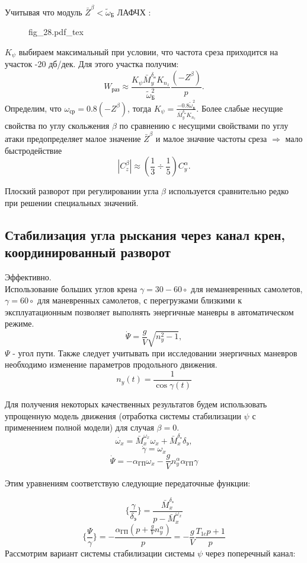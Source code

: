 \documentclass{article}
\begin{document}
Учитывая что модуль $\bar{Z}^\beta < \tilde{\omega}_\text{Б}$
ЛАФЧХ :
\begin{figure}[H]
	\centering
	{fig_28.pdf_tex}
\end{figure}

$K_{\psi}$ выбираем максимальный при условии, что частота среза приходится на участок -20 дб/дек. Для этого участка получим:
\[
	W_\text{раз} \approx \frac{K_{\psi}\bar{M}_y^{\delta_\text{н}} K_{n_z}}{\tilde{\omega}_\text{Б}^2}\frac{(-Z^\beta)}{p}.
\]
Определим, что $\omega_\text{ср} = 0.8(-Z^\beta)$, тогда $K_{\psi}=\frac{-0.8 \tilde{\omega}_\text{Б}^2}{\bar{M}_y^{\delta_\text{н}} K_{n_z}}$.
Более слабые несущие свойства по углу скольжения $\beta$ по сравнению с несущими свойствами по углу атаки предопределяет малое значение $\bar{Z}^\beta$ и малое значние частоты среза $\Rightarrow$ мало быстродействие
\[
	|C_z^\beta| \approx (\frac{1}{3} \div\frac{1}{5}) C_y^\alpha.
\]

Плоский разворот при регулировании угла $\beta$ используется сравнительно редко при решении специальных значений.

\subsection{Стабилизация угла рыскания через канал крен, координированный разворот}
Эффективно.\\
Использование больших углов крена $\gamma = 30 - 60 \circ$ для неманевренных самолетов, $\gamma = 60 \circ$ для маневренных самолетов, с перегрузками близкими к эксплуатационным позволяет выполнять энергичные маневры в автоматическом режиме.
\[
	\dot{\Psi} =\frac{g}{V} \sqrt{n_y^2 -1},
\]
$\Psi$ - угол пути. Также следует учитывать при исследовании энергичных маневров необходимо изменение параметров продольного движения.
\[
	n_y(t) =\frac{1}{\cos{\gamma(t)}}
\]

Для получения некоторых качественных результатов будем использовать упрощенную модель движения (отработка системы стабилизации $\psi$ с применением полной модели) для случая $\beta = 0$.
\[
	\dot{\omega_x} =\bar{M}_x^{\omega_x} \omega_x +\bar{M}_{x}^{\delta_\text{э}} \delta_\text{э},
\]
\[
	\dot{\gamma} = \omega_x
\]
\[
	\dot{\Psi} = - \alpha_\text{ГП}\omega_x - \frac{g}{V} n_y^\alpha \alpha_\text{ГП}\gamma
\]

Этим уравнениям соответствую следующие передаточные функции:

\[
	\{\frac{\gamma}{\delta_\text{э}} \} =\frac{\bar{M}_{x}^{\delta_\text{э}}}{p -\bar{M}_x^{\omega_x}}
\]
\[
	\{\frac{\Psi}{\gamma}\} = - \frac{\alpha_\text{ГП} (p + \frac{g}{V}n_y^\alpha)}{p} = -\frac{g}{V} \frac{T_{1c}p + 1}{p}
\]
Рассмотрим вариант системы стабилизации системы $\psi$ через поперечный канал:
\end{document}
